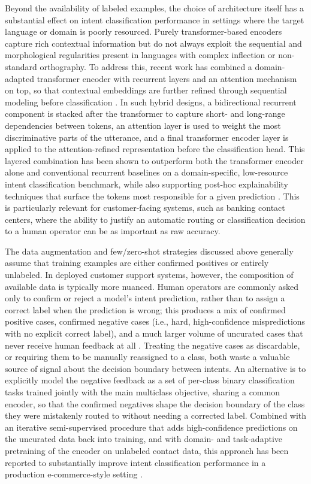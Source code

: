 \documentclass[12pt,a4paper,openright,twoside]{book}
\begin{document}
Beyond the availability of labeled examples, the choice of architecture itself has
a substantial effect on intent classification performance in settings where the
target language or domain is poorly resourced. Purely transformer-based
encoders capture rich contextual information but do not always exploit the
sequential and morphological regularities present in languages with complex
inflection or non-standard orthography. To address this, recent work has
combined a domain-adapted transformer encoder with recurrent layers and an
attention mechanism on top, so that contextual embeddings are further refined
through sequential modeling before classification \cite{shafeeq2026rahbar}. In such hybrid designs, a
bidirectional recurrent component is stacked after the transformer to capture
short- and long-range dependencies between tokens, an attention layer is used
to weight the most discriminative parts of the utterance, and a final
transformer encoder layer is applied to the attention-refined representation
before the classification head. This layered combination has been shown to
outperform both the transformer encoder alone and conventional recurrent
baselines on a domain-specific, low-resource intent classification benchmark,
while also supporting post-hoc explainability techniques that
surface the tokens most responsible for a given prediction \cite{shafeeq2026rahbar}.
This is particularly relevant for customer-facing systems, such as banking contact
centers, where the ability to justify an automatic routing or classification
decision to a human operator can be as important as raw accuracy.

The data augmentation and few/zero-shot strategies discussed above generally
assume that training examples are either confirmed positives or entirely
unlabeled. In deployed customer support systems, however, the composition of
available data is typically more nuanced. Human operators are commonly asked
only to confirm or reject a model's intent prediction, rather than to assign
a correct label when the prediction is wrong; this produces a mix of
confirmed positive cases, confirmed negative cases (i.e., hard, high-confidence
mispredictions with no explicit correct label), and a much larger volume of
uncurated cases that never receive human feedback at all \cite{dong2021semi}.
Treating the negative cases as discardable, or requiring them to be manually
reassigned to a class, both waste a valuable source of signal about the decision
boundary between intents. An alternative is to explicitly model the negative
feedback as a set of per-class binary classification tasks trained jointly
with the main multiclass objective, sharing a common encoder, so that the
confirmed negatives shape the decision boundary of the class they were
mistakenly routed to without needing a corrected label. Combined with an
iterative semi-supervised procedure that adds high-confidence predictions on
the uncurated data back into training, and with domain- and task-adaptive
pretraining of the encoder on unlabeled contact data, this approach has been
reported to substantially improve intent classification performance in a
production e-commerce-style setting \cite{dong2021semi}.
\end{document}
